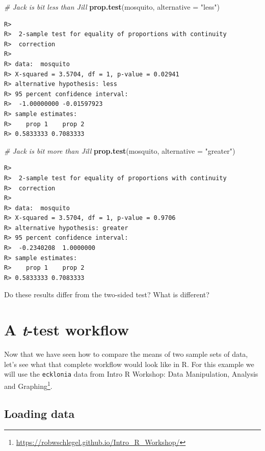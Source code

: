\documentclass[english,10pt,a4paper,oneside]{book}
\renewcommand{\href}[2]{#2\footnote{\url{#1}}}
\let\rmarkdownfootnote\footnote%
\def\footnote{\protect\rmarkdownfootnote}
\newenvironment{Shaded}{\begin{snugshade}}{\end{snugshade}}
\newcommand{\KeywordTok}[1]{\textcolor[rgb]{0.13,0.29,0.53}{\textbf{#1}}}
\newcommand{\DataTypeTok}[1]{\textcolor[rgb]{0.13,0.29,0.53}{#1}}
\newcommand{\StringTok}[1]{\textcolor[rgb]{0.31,0.60,0.02}{#1}}
\newcommand{\CommentTok}[1]{\textcolor[rgb]{0.56,0.35,0.01}{\textit{#1}}}
\newcommand{\NormalTok}[1]{#1}
\theoremstyle{definition}
\theoremstyle{definition}
\theoremstyle{definition}
\theoremstyle{remark}
\begin{document}
\begin{Shaded}
\begin{Highlighting}[]
\CommentTok{# Jack is bit less than Jill}
\KeywordTok{prop.test}\NormalTok{(mosquito, }\DataTypeTok{alternative =} \StringTok{"less"}\NormalTok{)}
\end{Highlighting}
\end{Shaded}

\begin{verbatim}
R> 
R>  2-sample test for equality of proportions with continuity
R>  correction
R> 
R> data:  mosquito
R> X-squared = 3.5704, df = 1, p-value = 0.02941
R> alternative hypothesis: less
R> 95 percent confidence interval:
R>  -1.00000000 -0.01597923
R> sample estimates:
R>    prop 1    prop 2 
R> 0.5833333 0.7083333
\end{verbatim}

\begin{Shaded}
\begin{Highlighting}[]
\CommentTok{# Jack is bit more than Jill}
\KeywordTok{prop.test}\NormalTok{(mosquito, }\DataTypeTok{alternative =} \StringTok{"greater"}\NormalTok{)}
\end{Highlighting}
\end{Shaded}

\begin{verbatim}
R> 
R>  2-sample test for equality of proportions with continuity
R>  correction
R> 
R> data:  mosquito
R> X-squared = 3.5704, df = 1, p-value = 0.9706
R> alternative hypothesis: greater
R> 95 percent confidence interval:
R>  -0.2340208  1.0000000
R> sample estimates:
R>    prop 1    prop 2 
R> 0.5833333 0.7083333
\end{verbatim}

Do these results differ from the two-sided test? What is different?

\section{\texorpdfstring{A \emph{t}-test
workflow}{A t-test workflow}}\label{a-t-test-workflow}

Now that we have seen how to compare the means of two sample sets of
data, let's see what that complete workflow would look like in R. For
this example we will use the \texttt{ecklonia} data from
\href{https://robwschlegel.github.io/Intro_R_Workshop/}{Intro R
Workshop: Data Manipulation, Analysis and Graphing}.

\subsection{Loading data}\label{loading-data}
\end{document}
